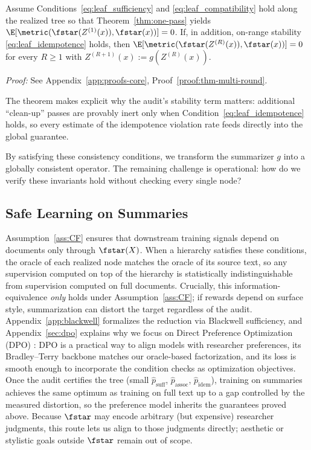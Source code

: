 \begin{theorem}\label{thm:multi-round}
Assume Conditions~\eqref{eq:leaf_sufficiency} and \eqref{eq:leaf_compatibility} hold along the realized tree so that Theorem~\ref{thm:one-pass} yields $\E[\metric(\fstar(Z^{(1)}(x)),\fstar(x))]=0$. If, in addition, on-range stability \eqref{eq:leaf_idempotence} holds, then $\E[\metric(\fstar(Z^{(R)}(x)),\fstar(x))]=0$ for every $R\ge1$ with $Z^{(R+1)}(x):=g(Z^{(R)}(x))$.
\end{theorem}

\noindent\textit{Proof:} See Appendix~\ref{app:proofs-core}, Proof~\ref{proof:thm-multi-round}.

The theorem makes explicit why the audit's stability term matters: additional ``clean-up'' passes are provably inert only when Condition~\eqref{eq:leaf_idempotence} holds, so every estimate of the idempotence violation rate feeds directly into the global guarantee.

By satisfying these consistency conditions, we transform the summarizer $g$ into a globally consistent operator. The remaining challenge is operational: how do we verify these invariants hold without checking every single node?

\subsection{Safe Learning on Summaries}\label{sec:exist-learn-transport}

Assumption~\ref{ass:CF} ensures that downstream training signals depend on documents only through $\fstar(X)$. When a hierarchy satisfies these conditions, the oracle of each realized node matches the oracle of its source text, so any supervision computed on top of the hierarchy is statistically indistinguishable from supervision computed on full documents. Crucially, this information-equivalence \emph{only} holds under Assumption~\ref{ass:CF}; if rewards depend on surface style, summarization can distort the target regardless of the audit. Appendix~\ref{app:blackwell} formalizes the reduction via Blackwell sufficiency, and Appendix~\ref{sec:dpo} explains why we focus on Direct Preference Optimization (DPO) \citep{RafailovEtAl2023DPO}: DPO is a practical way to align models with researcher preferences, its Bradley--Terry backbone matches our oracle-based factorization, and its loss is smooth enough to incorporate the condition checks as optimization objectives. Once the audit certifies the tree (small $\hat{p}_{\text{suff}}$, $\hat{p}_{\text{assoc}}$, $\hat{p}_{\text{idem}}$), training on summaries achieves the same optimum as training on full text up to a gap controlled by the measured distortion, so the preference model inherits the guarantees proved above. Because $\fstar$ may encode arbitrary (but expensive) researcher judgments, this route lets us align to those judgments directly; aesthetic or stylistic goals outside $\fstar$ remain out of scope.

